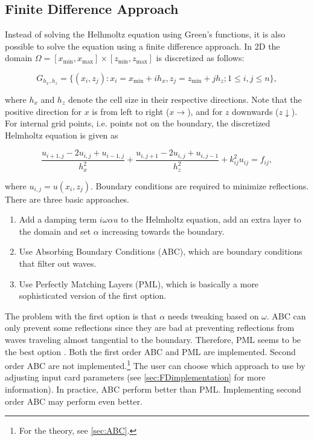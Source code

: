 \documentclass[10pt,a4paper]{article}
\begin{document}
\subsection{Finite Difference Approach}
Instead of solving the Helhmoltz equation using Green's functions, it is also possible to solve the equation using a finite difference approach. In 2D the domain $\Omega=[x_{\min},x_{\max}]\times [z_{\min},z_{\max}]$ is discretized as follows:

\begin{equation}
G_{h_x,h_z} = \{(x_i,z_j): x_i = x_{\min}+ ih_x, z_j=z_{\min}+jh_z; 1\leq i,j\leq n\},
\end{equation} 

where $h_x$ and $h_z$ denote the cell size in their respective directions. Note that the positive direction for $x$ is from left to right ($x\rightarrow$), and for $z$ downwards ($z\downarrow$). For internal grid points, i.e. points not on the boundary, the discretized Helmholtz equation is given as 

\begin{equation} \label{eqn:discret}
\frac{u_{i+1,j}-2u_{i,j}+u_{i-1,j}}{h_x^2} + \frac{u_{i,j+1}-2u_{i,j}+u_{i,j-1}}{h_z^2} + k_{ij}^2u_{ij}= f_{ij},
\end{equation}

where $u_{i,j}=u(x_i,z_j)$. Boundary conditions are required to minimize reflections. There are three basic approaches.
\begin{enumerate}
	\item Add a damping term $i\omega\alpha u$ to the Helmholtz equation, add an extra layer to the domain and set $\alpha$ increasing towards the boundary.
	\item Use Absorbing Boundary Conditions (ABC), which are boundary conditions that filter out waves.
	\item Use Perfectly Matching Layers (PML), which is basically a more sophisticated version of the first option.
\end{enumerate}

The problem with the first option is that $\alpha$ needs tweaking based on $\omega$. ABC can only prevent some reflections since they are bad at preventing reflections from waves traveling almost tangential to the boundary. Therefore, PML seems to be the best option \cite{Comparison}. Both the first order ABC and PML are implemented. Second order ABC are not implemented.\footnote{For the theory, see \cref{sec:ABC}.} The user can choose which approach to use by adjusting input card parameters (see \cref{sec:FDimplementation} for more information). In practice, ABC perform better than PML. Implementing second order ABC may perform even better.
\end{document}

